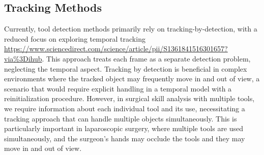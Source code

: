 

\subsection{Tracking Methods}



Currently, tool detection methods primarily rely on tracking-by-detection, with a reduced focus on exploring temporal tracking \url{https://www.sciencedirect.com/science/article/pii/S1361841516301657?via%3Dihub}. This approach treats each frame as a separate detection problem, neglecting the temporal aspect. Tracking by detection is beneficial in complex environments where the tracked object may frequently move in and out of view, a scenario that would require explicit handling in a temporal model with a reinitialization procedure. However, in surgical skill analysis with multiple tools, we require information about each individual tool and its use, necessitating a tracking approach that can handle multiple objects simultaneously. This is particularly important in laparoscopic surgery, where multiple tools are used simultaneously, and the surgeon's hands may occlude the tools and they may move in and out of view.

